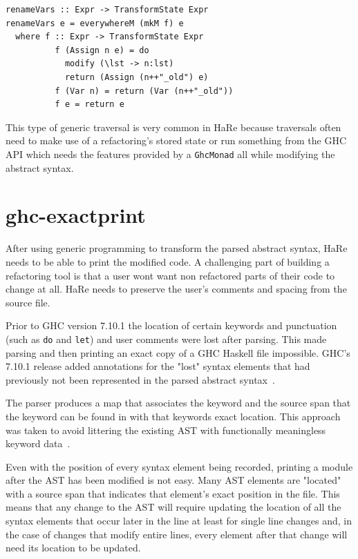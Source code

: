 \begin{lstlisting}[caption={Changing every found name and storing the old names in a list.},label=renameVars]
renameVars :: Expr -> TransformState Expr
renameVars e = everywhereM (mkM f) e
  where f :: Expr -> TransformState Expr
          f (Assign n e) = do
            modify (\lst -> n:lst)
            return (Assign (n++"_old") e)
          f (Var n) = return (Var (n++"_old"))
          f e = return e
\end{lstlisting}
 
This type of generic traversal is very common in HaRe because traversals often need to make use of a refactoring's stored state or run something from the GHC API which needs the features provided by a \texttt{GhcMonad} all while modifying the abstract syntax.   
	 
\section{ghc-exactprint}

After using generic programming to transform the parsed abstract syntax, HaRe needs to be able to print the modified code. A challenging part of building a refactoring tool is that a user wont want non refactored parts of their code to change at all. HaRe needs to preserve the user's comments and spacing from the source file.

Prior to GHC version 7.10.1 the location of certain keywords and punctuation (such as \texttt{do} and \texttt{let}) and user comments were lost after parsing. This made parsing and then printing an exact copy of a GHC Haskell file impossible. GHC's 7.10.1 release added annotations for the "lost" syntax elements that had previously not been represented in the parsed abstract syntax~\citep{apiAnns}. 

The parser produces a map that associates the keyword and the source span that the keyword can be found in with that keywords exact location. This approach was taken to avoid littering the existing AST with functionally meaningless keyword data~\citep{apiAnns}. 

Even with the position of every syntax element being recorded, printing a module after the AST has been modified is not easy. Many AST elements are "located" with a source span that indicates that element's exact position in the file. This means that any change to the AST will require updating the location of all the syntax elements that occur later in the line at least for single line changes and, in the case of changes that modify entire lines, every element after that change will need its location to be updated.

